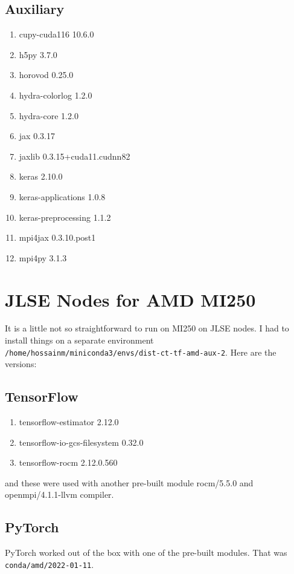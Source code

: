 \documentclass{article}
\begin{document}
\subsection{Auxiliary}
\begin{enumerate}
    \item cupy-cuda116              10.6.0
    \item h5py                      3.7.0
    \item horovod                   0.25.0
    \item hydra-colorlog            1.2.0
    \item hydra-core                1.2.0
    \item jax                       0.3.17
    \item jaxlib                    0.3.15+cuda11.cudnn82
    \item keras                     2.10.0
    \item keras-applications        1.0.8
    \item keras-preprocessing       1.1.2
    \item mpi4jax                   0.3.10.post1
    \item mpi4py                    3.1.3

\end{enumerate}

\section{JLSE Nodes for AMD MI250}
It is a little not so straightforward to run on MI250 on JLSE nodes. I had to
install things on a separate environment 
\verb|/home/hossainm/miniconda3/envs/dist-ct-tf-amd-aux-2|.
Here are the versions:

\subsection{TensorFlow}

\begin{enumerate}
\item tensorflow-estimator      2.12.0
\item tensorflow-io-gcs-filesystem 0.32.0
\item tensorflow-rocm           2.12.0.560
\end{enumerate}

and these were used with another pre-built module rocm/5.5.0 and 
openmpi/4.1.1-llvm compiler.


\subsection{PyTorch}
PyTorch worked out of the box with one of the pre-built modules. That was 
\verb|conda/amd/2022-01-11|.
\end{document}
